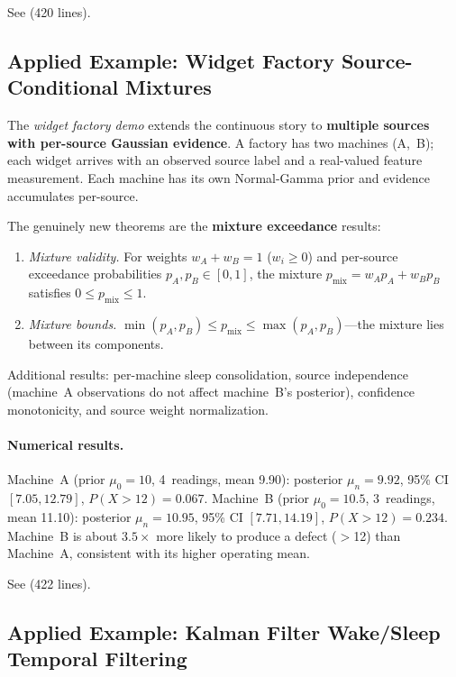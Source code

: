 \documentclass[11pt,openany]{report}
\begin{document}
See  (420 lines).

\subsection{Applied Example: Widget Factory Source-Conditional Mixtures}

The \emph{widget factory demo} extends the continuous story to
\textbf{multiple sources with per-source Gaussian evidence}.
A factory has two machines (A,~B); each widget arrives with an observed
source label and a real-valued feature measurement.  Each machine has
its own Normal-Gamma prior and evidence accumulates per-source.

The genuinely new theorems are the \textbf{mixture exceedance} results:
\begin{enumerate}
\item \emph{Mixture validity.}  For weights $w_A + w_B = 1$
  ($w_i \ge 0$) and per-source exceedance probabilities
  $p_A, p_B \in [0,1]$, the mixture
  $p_{\mathrm{mix}} = w_A p_A + w_B p_B$ satisfies
  $0 \le p_{\mathrm{mix}} \le 1$.

\item \emph{Mixture bounds.}  $\min(p_A, p_B) \le p_{\mathrm{mix}}
  \le \max(p_A, p_B)$---the mixture lies between its components.
\end{enumerate}
Additional results: per-machine sleep consolidation, source
independence (machine~A observations do not affect machine~B's
posterior), confidence monotonicity, and source weight normalization.

\paragraph{Numerical results.}
Machine~A (prior $\mu_0 = 10$, 4~readings, mean 9.90): posterior
$\mu_n = 9.92$, 95\% CI $[7.05, 12.79]$, $P(X > 12) = 0.067$.
Machine~B (prior $\mu_0 = 10.5$, 3~readings, mean 11.10): posterior
$\mu_n = 10.95$, 95\% CI $[7.71, 14.19]$, $P(X > 12) = 0.234$.
Machine~B is about $3.5\times$ more likely to produce a defect
($>$12) than Machine~A, consistent with its higher operating mean.

See  (422 lines).

\subsection{Applied Example: Kalman Filter Wake/Sleep Temporal Filtering}
\end{document}
